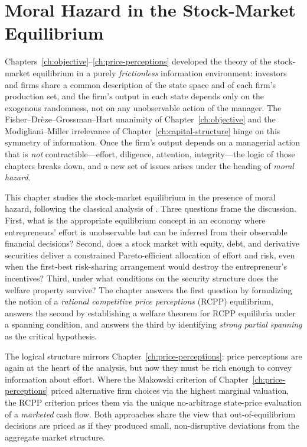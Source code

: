 \documentclass[11pt,a4paper,oneside]{book}
\theoremstyle{plain}
\theoremstyle{definition}
\theoremstyle{remark}
\numberwithin{equation}{chapter}
\begin{document}
\chapter{Moral Hazard in the Stock-Market Equilibrium}
\label{ch:moral-hazard}

Chapters~\ref{ch:objective}--\ref{ch:price-perceptions} developed the theory of the stock-market equilibrium in a purely \emph{frictionless} information environment: investors and firms share a common description of the state space and of each firm's production set, and the firm's output in each state depends only on the exogenous randomness, not on any unobservable action of the manager.
The Fisher--Drèze--Grossman--Hart unanimity of Chapter~\ref{ch:objective} and the Modigliani--Miller irrelevance of Chapter~\ref{ch:capital-structure} hinge on this symmetry of information.
Once the firm's output depends on a managerial action that is \emph{not} contractible---effort, diligence, attention, integrity---the logic of those chapters breaks down, and a new set of issues arises under the heading of \emph{moral hazard}.

This chapter studies the stock-market equilibrium in the presence of moral hazard, following the classical analysis of \citet{MagillQuinzii2002}.
Three questions frame the discussion.
First, what is the appropriate equilibrium concept in an economy where entrepreneurs' effort is unobservable but can be inferred from their observable financial decisions?
Second, does a stock market with equity, debt, and derivative securities deliver a constrained Pareto-efficient allocation of effort and risk, even when the first-best risk-sharing arrangement would destroy the entrepreneur's incentives?
Third, under what conditions on the security structure does the welfare property survive?
The chapter answers the first question by formalizing the notion of a \emph{rational competitive price perceptions} (RCPP) equilibrium, answers the second by establishing a welfare theorem for RCPP equilibria under a spanning condition, and answers the third by identifying \emph{strong partial spanning} as the critical hypothesis.

The logical structure mirrors Chapter~\ref{ch:price-perceptions}: price perceptions are again at the heart of the analysis, but now they must be rich enough to convey information about effort.
Where the Makowski criterion of Chapter~\ref{ch:price-perceptions} priced alternative firm choices via the highest marginal valuation, the RCPP criterion prices them via the unique no-arbitrage state-price evaluation of a \emph{marketed} cash flow.
Both approaches share the view that out-of-equilibrium decisions are priced as if they produced small, non-disruptive deviations from the aggregate market structure.
\end{document}
